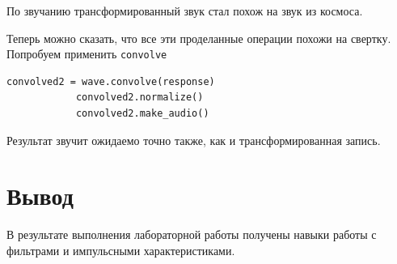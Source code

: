 \documentclass[a4paper,12pt]{article}
\begin{document}
\begin{enumerate}
		По звучанию трансформированный звук стал похож на звук из космоса.
		
		Теперь можно сказать, что все эти проделанные операции похожи на свертку. Попробуем применить \texttt{convolve}
		\begin{lstlisting}[caption=Оригинальный звук]
			convolved2 = wave.convolve(response)
			convolved2.normalize()
			convolved2.make_audio()
		\end{lstlisting}
		
		Результат звучит ожидаемо точно также, как и трансформированная запись.
		
	\end{enumerate}
	\newpage
	
	\section{Вывод}
	
	В результате выполнения лабораторной работы получены навыки работы с фильтрами и импульсными характеристиками.
\end{document}
